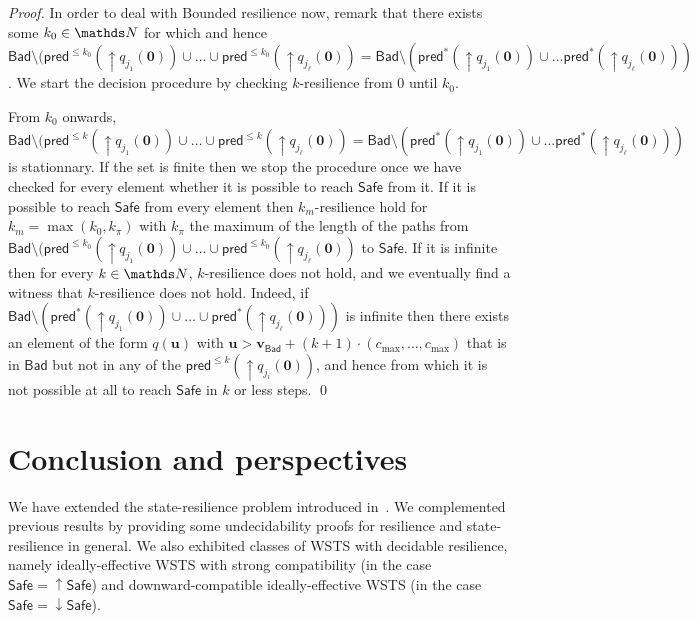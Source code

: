 \documentclass[runningheads]{llncs}
\newcommand{\pred}{\textsf{pred}}
\newcommand{\Bad}{\textsf{Bad}}
\newcommand{\Safe}{\textsf{Safe}}
\begin{document}
\begin{proof}
In order to deal with {\sc Bounded resilience} now, remark that there exists some $k_0 \in \N$ for which
and hence
$\Bad \setminus (\pred^{\leq k_0}(\uparrow q_{j_1}(\textbf{0}))\cup \ldots \cup \pred^{\leq k_0}(\uparrow q_{j_\ell}(\textbf{0}))= 
\Bad \setminus (\pred^{*}(\uparrow q_{j_1}(\textbf{0})) \cup \ldots \pred^{*}(\uparrow q_{j_\ell}(\textbf{0})) )$.
We start the decision procedure by checking {\sc $k$-resilience} from $0$ until $k_0$.

From $k_0$ onwards,
$\Bad \setminus (\pred^{\leq k}(\uparrow q_{j_1}(\textbf{0}))\cup \ldots \cup \pred^{\leq k}(\uparrow q_{j_\ell}(\textbf{0}))= 
\Bad \setminus (\pred^{*}(\uparrow q_{j_1}(\textbf{0})) \cup \ldots \pred^{*}(\uparrow q_{j_\ell}(\textbf{0})) )$
is stationnary. 
If the set is finite then we stop the procedure once we have checked for every element
whether it is possible to reach $\Safe$ from it.
If it is possible to reach $\Safe$ from every element then {\sc $k_m$-resilience}
hold
for $k_m = \max(k_0, k_{\pi})$ with 
$k_{\pi}$ the maximum of the length of the paths from 
$\Bad \setminus (\pred^{\leq k_0}(\uparrow q_{j_1}(\textbf{0}))\cup \ldots \cup \pred^{\leq k_0}(\uparrow q_{j_\ell}(\textbf{0}))$ to $\Safe$.
If it is infinite then
for every $k \in \N$,
$k$-resilience does not hold, 
and we eventually find a witness that $k$-resilience does not hold.
Indeed, 
if
$\Bad \setminus (\pred^{*}(\uparrow q_{j_1}(\textbf{0})) \cup \ldots \cup \pred^{*}(\uparrow q_{j_\ell}(\textbf{0})) )$
is
infinite
then
there exists an element of the form $q(\textbf{u} )$
with $\textbf{u} > \textbf{v}_{\Bad} + (k+1) \cdot (c_{\max}, \ldots, c_{\max})$ 
that is in $\Bad$ but not in any of the $\pred^{\leq k}(\uparrow q_{j_i}(\textbf{0}))$,
and hence from which it is not possible at all to reach
$\Safe$ in $k$ or less steps.
\qed
\end{proof}









\section{Conclusion and perspectives}


We have extended the state-resilience problem introduced in~\cite{DBLP:journals/corr/PrasadZ16,DBLP:journals/corr/abs-2108-00889,DBLP:conf/gg/Ozkan22}.
We complemented previous results by providing some undecidability proofs for resilience and state-resilience in general. We also exhibited classes of WSTS with decidable resilience, namely ideally-effective WSTS with strong compatibility (in the case 
 $\Safe = \uparrow \Safe$) and 
downward-compatible
ideally-effective WSTS
(in the case 
 $\Safe = \downarrow \Safe$).
\end{document}
